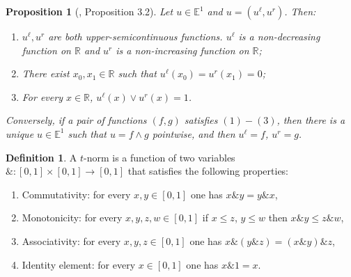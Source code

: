 \documentclass[preprint,3p,times]{elsarticle}
\theoremstyle{plain}
\newtheorem{prop}[thm]{Proposition}
\theoremstyle{definition}
\newtheorem{definition}[thm]{Definition}
\numberwithin{equation}{section}
\begin{document}
\begin{prop}[\cite{kouhui}, Proposition 3.2]\label{represent of fuzzy number}
    Let \( u \in \mathbb{E}^1 \) and \( u = (u^\ell, u^r) \). Then:
\begin{enumerate}[label={\textup{(\arabic*)}}]
    \item \( u^\ell,  u^r\)  are both upper-semicontinuous functions. \( u^\ell\) is a non-decreasing function on \( \mathbb{R} \) and  \(u^r\) is a non-increasing function on \( \mathbb{R} \);
    \item There exist \(x_0,x_1\in \mathbb{R}\) such that $u^\ell(x_0)=u^r(x_1)=0$;
    \item  For every \( x\in \mathbb{R} \), \( u^\ell(x)\vee u^r(x)=1\).
\end{enumerate}
Conversely, if a pair of functions $(f,g)$ satisfies \((1)-(3)\), then there is a unique $u\in\mathbb{E}^1$ such that $u=f\wedge g$ pointwise, and then $u^\ell=f$, $u^r=g$.

\end{prop} 


\begin{definition}\cite{Alsina2006}
    A \( t \)-norm is a function of two variables \( \& : [0,1] \times [0,1] \to [0,1] \) that satisfies the following properties:
\begin{enumerate}[label={\textup{(\arabic*)}}]
    \item Commutativity: for every \( x, y \in [0,1] \) one has \( x \&y = y\&x \),
    \item Monotonicity: for every \( x, y, z, w \in [0,1] \) if \( x \leq z \), \( y \leq w \) then  $x \& y \leq z\& w$,
    \item Associativity: for every \( x, y, z \in [0,1] \) one has \( x\& (y\& z) = (x\& y)\& z \),
    \item Identity element: for every \( x \in [0,1] \) one has \( x\& 1 = x \).
\end{enumerate}
\end{definition}
\end{document}
